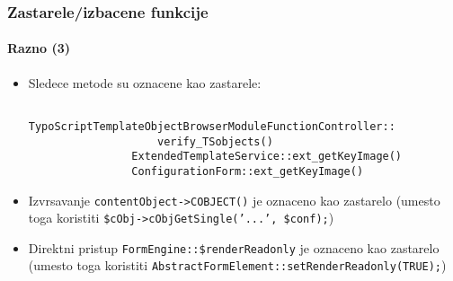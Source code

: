 \begin{frame}[fragile]
	\frametitle{Zastarele/izbacene funkcije}
	\framesubtitle{Razno (3)}

	\begin{itemize}
		\item Sledece metode su oznacene kao zastarele:

			\begin{lstlisting}
				TypoScriptTemplateObjectBrowserModuleFunctionController::
				    verify_TSobjects()
				ExtendedTemplateService::ext_getKeyImage()
				ConfigurationForm::ext_getKeyImage()
			\end{lstlisting}

 		\item Izvrsavanje \texttt{contentObject->COBJECT()} je oznaceno kao zastarelo\newline
 			\small(umesto toga koristiti \texttt{\$cObj->cObjGetSingle('...', \$conf);})\normalsize

		\item Direktni pristup \texttt{FormEngine::\$renderReadonly} je oznaceno kao zastarelo\newline
			\small(umesto toga koristiti \texttt{AbstractFormElement::setRenderReadonly(TRUE);})\normalsize

	\end{itemize}

\end{frame}


